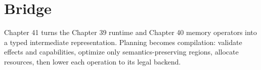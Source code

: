 \section{Bridge}
Chapter 41 turns the Chapter 39 runtime and Chapter 40 memory operators into a typed intermediate representation. Planning becomes compilation: validate effects and capabilities, optimize only semantics-preserving regions, allocate resources, then lower each operation to its legal backend.
